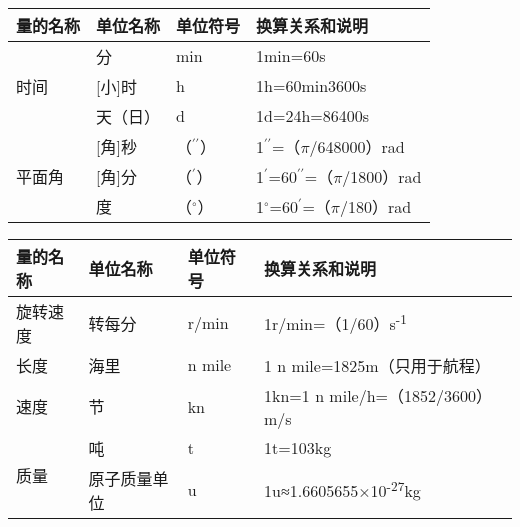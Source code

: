 \hspace*{\fill}\\

\begin{table}[htbp]
  \centering
  \caption{国家选定的非国际单位制单位}
  \begin{longtable}{p{2cm}<{\centering}p{3cm}<{\centering}p{2cm}<{\centering}p{6cm}<{\centering}}
    \toprule
    {量的名称}    & 单位名称    & 单位符号    & 换算关系和说明    \\
    \midrule
    \multirow{3}[2]{*}{时间}   & 分    & min    & 1min=60s    \\
    & [小]时    & h    & 1h=60min3600s    \\
    & 天（日）    & d    & 1d=24h=86400s    \\
    \midrule
    \multirow{3}[2]{*}{平面角} & [角]秒    & （$^{\prime\prime}$） & 1$^{\prime\prime}$=（$\pi$/648000）rad    \\
    & [角]分    & （$^{\prime}$）    & 1$^{\prime}$=60$^{\prime\prime}$=（$\pi$/1800）rad \\
    & 度    & （$^{\circ}$）    & 1$^{\circ}$=60$^{\prime}$=（$\pi$/180）rad    \\
    \bottomrule
  \end{longtable}%
  \label{tab:tbl-b4}%
\end{table}%


\begin{table}[htbp]
  \centering
  \begin{longtable}{p{2cm}<{\centering}p{3cm}<{\centering}p{2cm}<{\centering}p{6cm}<{\centering}}
    \toprule
    {量的名称}    & 单位名称    & 单位符号    & 换算关系和说明    \\
    \midrule
    旋转速度    & 转每分    & r/min    & 1r/min=（1/60）s\textsuperscript{-1}    \\
    \midrule
    长度    & 海里    & n mile    & 1 n mile=1825m（只用于航程）    \\
    \midrule
    速度    & 节    & kn    & 1kn=1 n mile/h=（1852/3600）m/s \\
    \midrule
    \multirow{2}[0]{*}{质量}   & 吨    & t    & 1t=103kg    \\
    & 原子质量单位 & u    & 1u≈1.6605655×10\textsuperscript{-27}kg    \\
    \bottomrule
  \end{longtable}%
\end{table}%

\hspace*{\fill} \\



